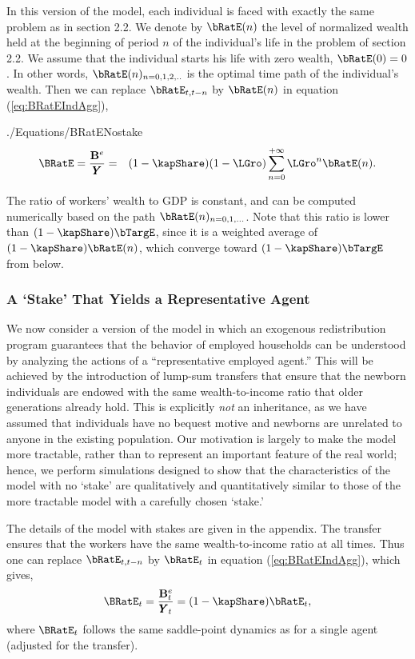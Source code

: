 \documentclass[titlepage]{\econtex}\newcommand{\texname}{cjSOE}
\renewcommand{\GDPLev}{\ensuremath{\pmb{Y}}}
\begin{document}
In this version of the model, each individual is faced with exactly
the same problem as in section 2.2. We denote by $\bRatE(n)$ the level
of normalized wealth held at the beginning of period $n$ of the
individual's life in the problem of section 2.2. We assume that the
individual starts his life with zero wealth, $\bRatE(0)=0$. In other
words, $\bRatE(n)_{n=0,1,2,..}$ is the optimal time path of the
individual's wealth. Then we can replace $\bRatE_{t,t-n}$ by
$\bRatE(n)$ in equation (\ref{eq:BRatEIndAgg}),
\begin{verbatimwrite}{./Equations/BRatENostake}
\begin{eqnarray}
\BRatE = \frac{\BLevE}{\GDPLev} & = & (1-\kapShare) (1-\LGro)\sum_{n=0}^{+\infty}\LGro^{n} \bRatE(n).
\label{eq:BRatENostake}
\end{eqnarray}
\end{verbatimwrite}

The ratio of workers' wealth to GDP is constant, and can be computed numerically based on the path $\bRatE(n)_{n=0,1,...}$. Note that this ratio is lower than $(1-\kapShare) \bTargE$, since it is a weighted average of $(1-\kapShare) \bRatE(n)$, which converge toward $(1-\kapShare) \bTargE$ from below.



\subsubsection{A `Stake' That Yields a Representative Agent}

We now consider a version of the model in which an exogenous
redistribution program guarantees that the behavior of employed
households can be understood by analyzing the actions of a
``representative employed agent.'' This will be achieved by the
introduction of lump-sum transfers that ensure that the newborn
individuals are endowed with the same wealth-to-income ratio that
older generations already hold. This is explicitly {\it not} an
inheritance, as we have assumed that individuals have no bequest
motive and newborns are unrelated to anyone in the existing
population.  Our motivation is largely to make the model more
tractable, rather than to represent an important feature of the real
world; hence, we perform simulations designed to show that the
characteristics of the model with no `stake' are qualitatively and
quantitatively similar to those of the more tractable model with a
carefully chosen `stake.'


The details of the model with stakes are given in the appendix. The transfer ensures that the workers have the same wealth-to-income ratio at all times. Thus one can replace $\bRatE_{t,t-n}$ by $\bRatE_t$ in equation (\ref{eq:BRatEIndAgg}), which gives,
\begin{equation}
\BRatE_{t} = \frac{\BLevE_t}{\GDPLev_t}= (1-\kapShare ) \bRatE_t,
\label{eq:BRatEStakest}
\end{equation}
where $\BRatE_t$ follows the same saddle-point dynamics as for a single agent (adjusted for the transfer).
\end{document}
